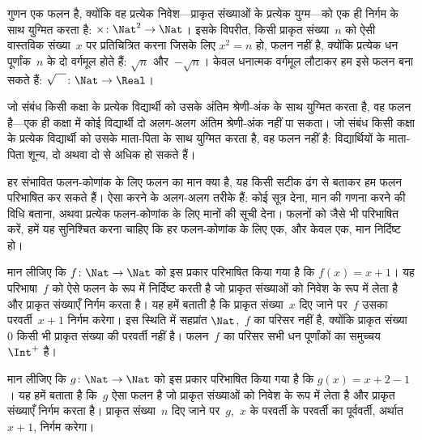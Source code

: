 \documentclass[../../../include/open-logic-section]{subfiles}
\begin{document}
\begin{ex}
गुणन एक फलन है, क्योंकि वह प्रत्येक निवेश---प्राकृत संख्याओं के प्रत्येक
युग्म---को एक ही निर्गम के साथ युग्मित करता है: $\times \colon \Nat^2 \to
\Nat$। इसके विपरीत, किसी प्राकृत संख्या~$n$ को ऐसी वास्तविक संख्या~$x$ पर
प्रतिचित्रित करना जिसके लिए $x^2 = n$ हो, फलन नहीं है, क्योंकि प्रत्येक धन
पूर्णांक~$n$ के दो वर्गमूल होते हैं: $\sqrt{n}$ और~$-\sqrt{n}$। केवल धनात्मक
वर्गमूल लौटाकर हम इसे फलन बना सकते हैं: $\sqrt{\phantom{X}} \colon
\Nat \to \Real$।
\end{ex}

\begin{ex}
जो संबंध किसी कक्षा के प्रत्येक विद्यार्थी को उसके अंतिम श्रेणी-अंक के साथ
युग्मित करता है, वह फलन है---एक ही कक्षा में कोई विद्यार्थी दो अलग-अलग अंतिम
श्रेणी-अंक नहीं पा सकता। जो संबंध किसी कक्षा के प्रत्येक विद्यार्थी को उसके
माता-पिता के साथ युग्मित करता है, वह फलन नहीं है: विद्यार्थियों के माता-पिता
शून्य, दो अथवा दो से अधिक हो सकते हैं।
\end{ex}

\begin{explain}
हर संभावित फलन-कोणांक के लिए फलन का मान क्या है, यह किसी सटीक ढंग से बताकर हम
फलन परिभाषित कर सकते हैं। ऐसा करने के अलग-अलग तरीके हैं: कोई सूत्र देना, मान
की गणना करने की विधि बताना, अथवा प्रत्येक फलन-कोणांक के लिए मानों की सूची
देना। फलनों को जैसे भी परिभाषित करें, हमें यह सुनिश्चित करना चाहिए कि हर
फलन-कोणांक के लिए एक, और केवल एक, मान निर्दिष्ट हो।
\end{explain}


\begin{ex}
मान लीजिए कि $f \colon \Nat \to \Nat$ को इस प्रकार परिभाषित किया गया है कि
$f(x) = x+1$। यह परिभाषा~$f$ को ऐसे फलन के रूप में निर्दिष्ट करती है जो
प्राकृत संख्याओं को निवेश के रूप में लेता है और प्राकृत संख्याएँ निर्गम करता
है। यह हमें बताती है कि प्राकृत संख्या~$x$ दिए जाने पर~$f$ उसका परवर्ती~$x+1$
निर्गम करेगा। इस स्थिति में सहप्रांत $\Nat$,~$f$ का परिसर नहीं है, क्योंकि
प्राकृत संख्या~$0$ किसी भी प्राकृत संख्या की परवर्ती नहीं है। फलन~$f$ का
परिसर सभी धन पूर्णांकों का समुच्चय $\Int^{+}$ है।
\end{ex}

\begin{ex}
मान लीजिए कि $g \colon \Nat \to \Nat$ को इस प्रकार परिभाषित किया गया है कि
$g(x) = x+2-1$। यह हमें बताता है कि~$g$ ऐसा फलन है जो प्राकृत संख्याओं को
निवेश के रूप में लेता है और प्राकृत संख्याएँ निर्गम करता है। प्राकृत
संख्या~$n$ दिए जाने पर~$g$,~$x$ के परवर्ती के परवर्ती का पूर्ववर्ती, अर्थात
$x+1$, निर्गम करेगा।
\end{ex}
\end{document}
